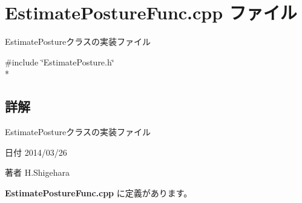 \section{Estimate\-Posture\-Func.\-cpp ファイル}
\label{_estimate_posture_func_8cpp}


Estimate\-Postureクラスの実装ファイル  


{\ttfamily \#include \char`\"{}Estimate\-Posture.\-h\char`\"{}}\\*


\subsection{詳解}
Estimate\-Postureクラスの実装ファイル \begin{DoxyDate}{日付}
2014/03/26 
\end{DoxyDate}
\begin{DoxyAuthor}{著者}
H.\-Shigehara 
\end{DoxyAuthor}


 {\bf Estimate\-Posture\-Func.\-cpp} に定義があります。

